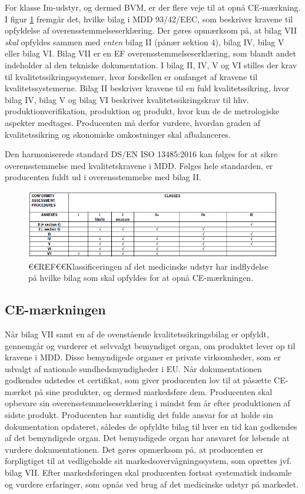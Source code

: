 For klasse Im-udstyr, og dermed BVM, er der flere veje til at opnå CE-mærkning. I figur \ref{fig:Klas} fremgår det, hvilke bilag i MDD 93/42/EEC, som beskriver kravene til opfyldelse af overensstemmelseserklæring. Der gøres opmærksom på, at bilag VII \textit{skal} opfyldes sammen med \textit{enten} bilag II (pånær sektion 4), bilag IV, bilag V eller bilag VI. Bilag VII er en EF overensstemmelseserklæring, som blandt andet indeholder al den tekniske dokumentation. I bilag II, IV, V og VI stilles der krav til kvalitetssikringssystemer, hvor forskellen er omfanget af kravene til kvalitetssystemerne. Bilag II beskriver kravene til en fuld kvalitetssikring, hvor bilag IV, bilag V og bilag VI beskriver kvalitetssikringskrav til hhv. produktionverifikation, produktion og produkt, hvor kun de de metrologiske aspekter medtages. Producenten må derfor vurdere, hvordan graden af kvalitetssikring og økonomiske omkostninger skal afbalanceres.   

    Den harmoniserede standard DS/EN ISO 13485:2016 kan følges for at sikre overensstemmelse med kvalitetskravene i MDD. Følges hele standarden, er producenten fuldt ud i overensstemmelse med bilag II. 

\begin{figure}[htb]
\centering
\includegraphics[width=5in]{Klassificering}
\caption{€€REF€€Klassificeringen af det medicinske udstyr har indflydelse på hvilke bilag som skal opfyldes for at opnå CE-mærkningen.}
\label{fig:Klas}
\end{figure}

\subsection{CE-mærkningen}
   
Når bilag VII samt en af de ovenstående kvalitetssikringsbilag er opfyldt, gennemgår og vurderer et selvvalgt bemyndiget organ, om produktet lever op til kravene i MDD. Disse bemyndigede organer er private virksomheder, som er udvalgt af nationale sundhedsmyndigheder i EU. Når dokumentationen godkendes udstedes et certifikat, som giver producenten lov til at påsætte CE-mærket på sine produkter, og dermed markedsføre dem.    
 Producenten skal opbevare sin overensstemmelseserklæring i mindst fem år efter produktionen af sidste produkt. Producenten har samtidig det fulde ansvar for at holde sin dokumentation opdateret, således de opfyldte bilag til hver en tid kan godkendes af det bemyndigede organ. Det bemyndigede organ har ansvaret for løbende at vurdere dokumentationen.
Det gøres opmærksom på, at producenten er forpligtiget til at vedligeholde sit markedsovervågningssystem, som oprettes jvf. bilag VII. Efter markedsføringen skal producenten fortsat systematisk indsamle og vurdere erfaringer, som opnås ved brug af det medicinske udstyr på markedet. 

